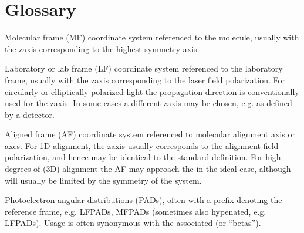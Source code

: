 \documentclass[letterpaper,table,10pt,english]{jupyterBook}
\begin{document}
\chapter{Glossary}
\label{\detokenize{backmatter/glossary:glossary}}\label{\detokenize{backmatter/glossary::doc}}\begin{description}
\sphinxAtStartPar
Molecular frame (MF) \sphinxhyphen{} coordinate system referenced to the molecule, usually with the z\sphinxhyphen{}axis corresponding to the highest symmetry axis.

\sphinxAtStartPar
Laboratory or lab frame (LF) \sphinxhyphen{} coordinate system referenced to the laboratory frame, usually with the z\sphinxhyphen{}axis corresponding to the laser field polarization. For circularly or elliptically polarized light the propagation direction is conventionally used for the z\sphinxhyphen{}axis. In some cases a different z\sphinxhyphen{}axis may be chosen, e.g. as defined by a detector.

\sphinxAtStartPar
Aligned frame (AF) \sphinxhyphen{} coordinate system referenced to molecular alignment axis or axes. For 1D alignment, the z\sphinxhyphen{}axis usually corresponds to the alignment field polarization, and hence may be identical to the standard {\hyperref[\detokenize{backmatter/glossary:term-LF}]{}} definition. For high degrees of (3D) alignment the AF may approach the {\hyperref[\detokenize{backmatter/glossary:term-MF}]{}} in the ideal case, although will usually be limited by the symmetry of the system.

\sphinxAtStartPar
Photoelectron angular distributions (PADs), often with a prefix denoting the reference frame, e.g. LFPADs, MFPADs (sometimes also hypenated, e.g. LF\sphinxhyphen{}PADs). Usage is often synonymous with the associated {\hyperref[\detokenize{backmatter/glossary:term-anisotropy-paramters}]{}} (or “betas”).


\end{description}
\end{document}

